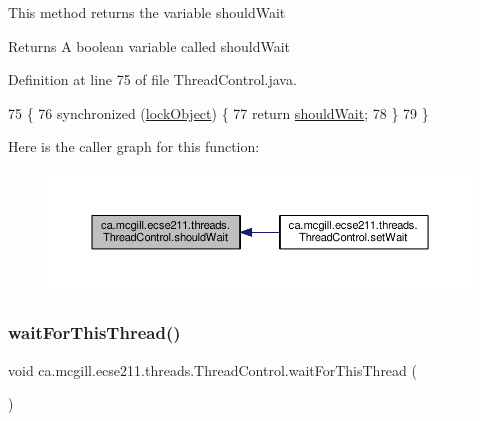 This method returns the variable should\+Wait

\begin{DoxyReturn}{Returns}
A boolean variable called should\+Wait 
\end{DoxyReturn}


Definition at line 75 of file Thread\+Control.\+java.


\begin{DoxyCode}
75                               \{
76     \textcolor{keyword}{synchronized} (\hyperlink{classca_1_1mcgill_1_1ecse211_1_1threads_1_1_thread_control_ab20c44ff2dafab8981c42fa8bf634dfc}{lockObject}) \{
77       \textcolor{keywordflow}{return} \hyperlink{classca_1_1mcgill_1_1ecse211_1_1threads_1_1_thread_control_a9c3896500e86e402b8019e1be6500621}{shouldWait};
78     \}
79   \}
\end{DoxyCode}
Here is the caller graph for this function\+:\nopagebreak
\begin{figure}[H]
\begin{center}
\leavevmode
\includegraphics[width=350pt]{classca_1_1mcgill_1_1ecse211_1_1threads_1_1_thread_control_a9c3896500e86e402b8019e1be6500621_icgraph}
\end{center}
\end{figure}
\mbox{\label{classca_1_1mcgill_1_1ecse211_1_1threads_1_1_thread_control_a6a25ccb2d8916b8e6cc4b3bb0e9d2ed7}} 
\subsubsection{\texorpdfstring{wait\+For\+This\+Thread()}{waitForThisThread()}}
{\footnotesize\ttfamily void ca.\+mcgill.\+ecse211.\+threads.\+Thread\+Control.\+wait\+For\+This\+Thread (\begin{DoxyParamCaption}{ }\end{DoxyParamCaption})}

